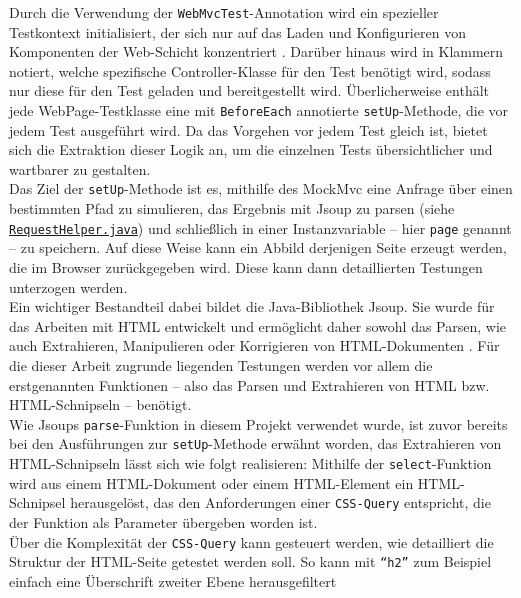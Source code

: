 Durch die Verwendung der \texttt{WebMvcTest}-Annotation wird ein spezieller 
Testkontext initialisiert, der sich nur auf das Laden und Konfigurieren von 
Komponenten der Web-Schicht konzentriert \cite{vmware2024webmvctest}. 
Darüber hinaus wird in Klammern notiert, welche spezifische Controller-Klasse für 
den Test benötigt wird, sodass nur diese für den Test geladen und bereitgestellt 
wird. Überlicherweise enthält jede WebPage-Testklasse eine mit \texttt{BeforeEach} 
annotierte \texttt{setUp}-Methode, die vor jedem Test ausgeführt wird. Da das 
Vorgehen vor jedem Test gleich ist, bietet sich die Extraktion dieser Logik an, 
um die einzelnen Tests übersichtlicher und wartbarer zu gestalten. \\ 
Das Ziel der \texttt{setUp}-Methode ist es, mithilfe des MockMvc eine Anfrage über 
einen bestimmten Pfad zu simulieren, das Ergebnis mit Jsoup zu parsen (siehe 
\href{https://github.com/FlorianOhmes/bat_spielzeitenplaner/blob/main/spielzeitenplaner/src/test/java/de/bathesis/spielzeitenplaner/utilities/RequestHelper.java}{\texttt{RequestHelper.java}}) und schließlich in einer 
Instanzvariable -- hier \texttt{page} genannt -- zu speichern. Auf diese Weise kann 
ein Abbild derjenigen Seite erzeugt werden, die im Browser zurückgegeben wird. 
Diese kann dann detaillierten Testungen unterzogen werden. \\ 
Ein wichtiger Bestandteil dabei bildet die Java-Bibliothek Jsoup. Sie wurde für das 
Arbeiten mit HTML entwickelt und ermöglicht daher sowohl das Parsen, wie auch 
Extrahieren, Manipulieren oder Korrigieren von HTML-Dokumenten 
\cite{hedley2024jsoup}. Für die dieser Arbeit zugrunde liegenden 
Testungen werden vor allem die erstgenannten Funktionen -- also das Parsen und 
Extrahieren von HTML bzw. HTML-Schnipseln -- benötigt. \\ 
Wie Jsoups \texttt{parse}-Funktion in diesem Projekt verwendet wurde, ist zuvor bereits 
bei den Ausführungen zur \texttt{setUp}-Methode erwähnt worden, das Extrahieren von 
HTML-Schnipseln lässt sich wie folgt realisieren: Mithilfe der \texttt{select}-Funktion 
wird aus einem HTML-Dokument oder einem HTML-Element ein HTML-Schnipsel herausgelöst, das 
den Anforderungen einer \texttt{CSS-Query} entspricht, die der Funktion als Parameter 
übergeben worden ist. \\ 
Über die Komplexität der \texttt{CSS-Query} kann gesteuert werden, wie 
detailliert die Struktur der HTML-Seite getestet werden soll. So kann mit 
\texttt{``h2''} zum Beispiel einfach eine Überschrift zweiter Ebene herausgefiltert 
